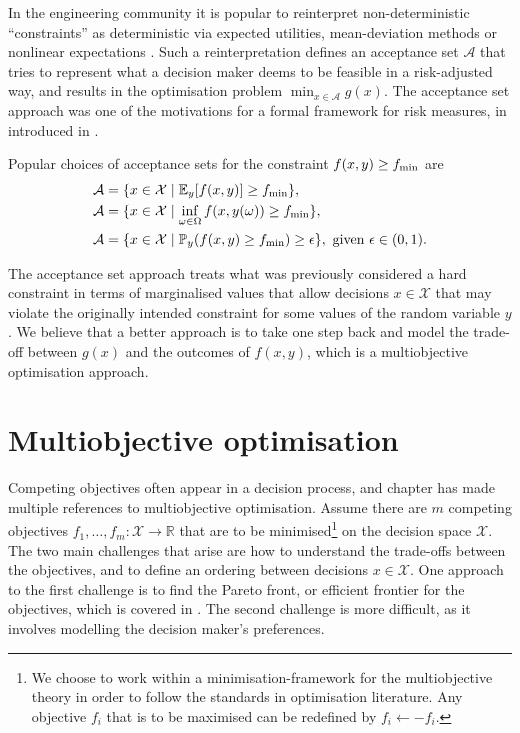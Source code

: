 \documentclass[main.tex]{subfiles}
\begin{document}
In the engineering community it is popular to
reinterpret non-deterministic ``constraints'' as deterministic via
expected utilities, mean-deviation methods or nonlinear
expectations
\citep{rockafellar2007coherent,rockafellar2015engineering}.
Such a reinterpretation defines an acceptance set $\mathcal{A}$ that
tries to represent what a decision maker deems to be feasible in a
risk-adjusted way, and results in the optimisation problem
$\min_{x\in\mathcal{A}} g(x)$.
The acceptance set approach was one of the motivations for a formal
framework for risk measures, in introduced in \citep{artzner1999coherent}.
\begin{example}
  Popular choices of acceptance sets for the constraint $f(x,y)\geq
  f_{\textnormal{min}}$ are
  \begin{align}
    \mathcal{A}&=\{x\in\mathcal{X} \mid
                 \mathbb{E}_y[f(x,y)]\geq f_{\textnormal{min}}\}, \\
    \mathcal{A}&=\{x\in\mathcal{X} \mid
                 \inf_{\omega\in\Omega}f(x,y(\omega))\geq f_{\textnormal{min}}\},\\
    \mathcal{A} &= \{x\in\mathcal{X}\mid
                  \mathbb{P}_y(f(x,y)\geq f_{\textnormal{min}})\geq \epsilon\},
                  \text{ given }\epsilon\in(0,1).
  \end{align}
\end{example}

The acceptance set approach treats what was previously considered a
hard constraint in terms of marginalised values that allow decisions $x\in\mathcal{X}$
that may violate the originally intended constraint for some values of the random
variable $y$. We believe that a better approach is to take one step back
and model the trade-off between $g(x)$ and the outcomes of $f(x,y)$,
which is a multiobjective optimisation approach.

\section{Multiobjective optimisation}\label{sec:one_multiobjective}

Competing objectives often appear in a decision process, and chapter
has made multiple references to multiobjective optimisation.  Assume
there are $m$ competing objectives
$f_1,\dots,f_m:\mathcal{X}\to\mathbb{R}$ that are to be
minimised\footnote{We choose to work within a minimisation-framework
  for the multiobjective theory in order to follow the standards in
  optimisation literature. Any objective $f_i$ that is to be maximised
  can be redefined by $f_i\leftarrow -f_i$.  } on the decision space
$\mathcal{X}$. The two main challenges that arise are how to understand
the trade-offs between the objectives, and to define an ordering
between decisions $x\in\mathcal{X}$.  One approach to the first
challenge is to find the Pareto front, or efficient
frontier for the objectives, which is covered in
. The second challenge is more difficult,
as it involves modelling the decision maker's preferences.
\end{document}

